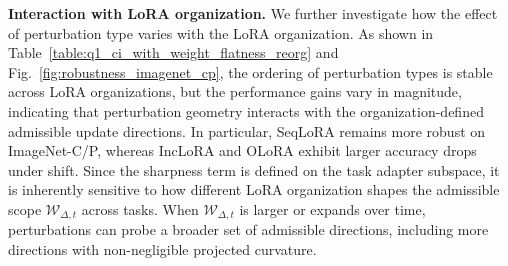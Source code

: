 \documentclass{article}
\theoremstyle{plain}
\theoremstyle{definition}
\theoremstyle{remark}
\begin{document}
\noindent\textbf{Interaction with LoRA organization.}\quad
We further investigate how the effect of perturbation {type} varies with the LoRA organization. 
As shown in Table~\ref{table:q1_ci_with_weight_flatness_reorg} and  Fig.~\ref{fig:robustness_imagenet_cp}, the ordering of perturbation types is stable across LoRA organizations, but the performance gains vary in magnitude, indicating that perturbation geometry interacts with the organization-defined admissible update directions.
In particular, SeqLoRA remains more robust on ImageNet-C/P, whereas IncLoRA and OLoRA exhibit larger accuracy drops under shift.
Since the sharpness term is defined on the task adapter subspace, it is inherently sensitive to how different LoRA organization shapes the admissible scope $\mathcal W_{\Delta,t}$ across tasks. When $\mathcal W_{\Delta,t}$ is larger or expands over time, perturbations can probe a broader set of admissible directions, including more directions with non-negligible projected curvature.


\end{document}
